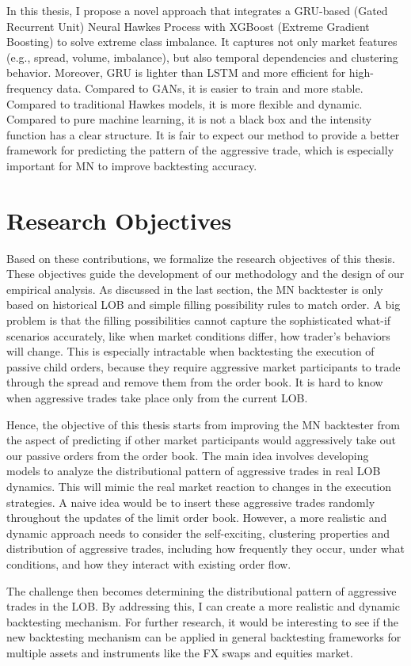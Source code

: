 In this thesis, I propose a novel approach that integrates a GRU-based (Gated Recurrent Unit) Neural Hawkes Process with XGBoost (Extreme Gradient Boosting) to solve extreme class imbalance. It captures not only market features (e.g., spread, volume, imbalance), but also temporal dependencies and clustering behavior. Moreover, GRU is lighter than LSTM and more efficient for high-frequency data. Compared to GANs, it is easier to train and more stable. Compared to traditional Hawkes models, it is more flexible and dynamic. Compared to pure machine learning, it is not a black box and the intensity function has a clear structure. It is fair to expect our method to provide a better framework for predicting the pattern of the aggressive trade, which is especially important for MN to improve backtesting accuracy.

\section{Research Objectives}\label{sec:researchobjectives}
Based on these contributions, we formalize the research objectives of this thesis. These objectives guide the development of our methodology and the design of our empirical analysis.
As discussed in the last section, the MN backtester is only based on historical LOB and simple filling possibility rules to match order. A big problem is that the filling possibilities cannot capture the sophisticated what-if scenarios accurately, like when market conditions differ, how trader's behaviors will change. This is especially intractable when backtesting the execution of passive child orders, because they require aggressive market participants to trade through the spread and remove them from the order book. It is hard to know when aggressive trades take place only from the current LOB. 

Hence, the objective of this thesis starts from improving the MN backtester from the aspect of predicting if other market participants would aggressively take out our passive orders from the order book. The main idea involves developing models to analyze the distributional pattern of aggressive trades in real LOB dynamics. This will mimic the real market reaction to changes in the execution strategies. A naive idea would be to insert these aggressive trades randomly throughout the updates of the limit order book. However, a more realistic and dynamic approach needs to consider the self-exciting, clustering properties and distribution of aggressive trades, including how frequently they occur, under what conditions, and how they interact with existing order flow.

The challenge then becomes determining the distributional pattern of aggressive trades in the LOB. By addressing this, I can create a more realistic and dynamic backtesting mechanism. For further research, it would be interesting to see if the new backtesting mechanism can be applied in general backtesting frameworks for multiple assets and instruments like the FX swaps and equities market.


